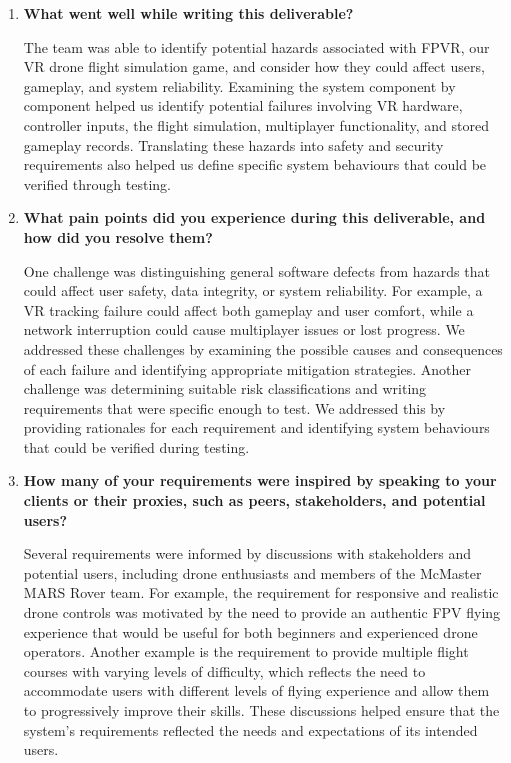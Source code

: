 \documentclass{article}
\begin{document}
\begin{enumerate}

    \item \textbf{What went well while writing this deliverable?}

    The team was able to identify potential hazards associated with
    FPVR, our VR drone flight simulation game, and consider how they
    could affect users, gameplay, and system reliability. Examining
    the system component by component helped us identify potential
    failures involving VR hardware, controller inputs, the flight
    simulation, multiplayer functionality, and stored gameplay records.
    Translating these hazards into safety and security requirements
    also helped us define specific system behaviours that could be
    verified through testing.

    \item \textbf{What pain points did you experience during this
    deliverable, and how did you resolve them?}

    One challenge was distinguishing general software defects from
    hazards that could affect user safety, data integrity, or system
    reliability. For example, a VR tracking failure could affect both
    gameplay and user comfort, while a network interruption could
    cause multiplayer issues or lost progress. We addressed these
    challenges by examining the possible causes and consequences of
    each failure and identifying appropriate mitigation strategies.
    Another challenge was determining suitable risk classifications
    and writing requirements that were specific enough to test.
    We addressed this by providing rationales for each requirement
    and identifying system behaviours that could be verified during
    testing.

    \item \textbf{How many of your requirements were inspired by
    speaking to your clients or their proxies, such as peers,
    stakeholders, and potential users?}

   Several requirements were informed by discussions with stakeholders and potential users, including drone enthusiasts and members of the McMaster MARS Rover team. For example, the requirement for responsive and realistic drone controls was motivated by the need to provide an authentic FPV flying experience that would be useful for both beginners and experienced drone operators. Another example is the requirement to provide multiple flight courses with varying levels of difficulty, which reflects the need to accommodate users with different levels of flying experience and allow them to progressively improve their skills. These discussions helped ensure that the system's requirements reflected the needs and expectations of its intended users.


\end{enumerate}
\end{document}

